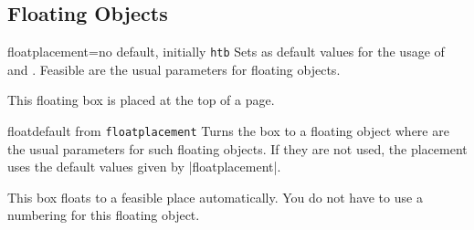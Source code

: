 

\clearpage
\subsection{Floating Objects}
\begin{docTcbKey}{floatplacement}{=}{no default, initially \texttt{htb}}
  Sets  as default values for the usage of 
  and .
  Feasible are the usual parameters for floating objects.
\begin{dispListing}

\begin{tcolorbox}[floatplacement=t,float,
                  title=Floating box from |floatplacement|,
                  watermark text={I am floating}]
  This floating box is placed at the top of a page.
\end{tcolorbox}
\end{dispListing}
\end{docTcbKey}
{\tcbusetemp}


\begin{docTcbKey}{float}{}{default from \texttt{floatplacement}}
  Turns the box to a floating object where  are the
  usual parameters for such floating objects.
  If they are not used, the placement uses the default values given by
 |floatplacement|.
\begin{dispListing}
\begin{tcolorbox}[float, title=Floating box from |float|,
    enhanced,watermark text={I'm also floating}]
  This box floats to a feasible place automatically. You do not have to
  use a numbering for this floating object.
\end{tcolorbox}
\end{dispListing}
\end{docTcbKey}
{\tcbusetemp}


